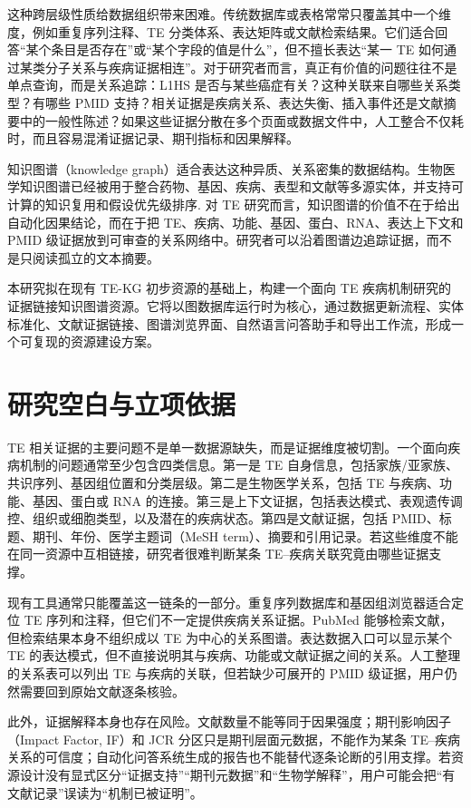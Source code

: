 \documentclass[12pt,a4paper,UTF8]{ctexart}
\begin{document}
这种跨层级性质给数据组织带来困难。传统数据库或表格常常只覆盖其中一个维度，例如重复序列注释、TE 分类体系、表达矩阵或文献检索结果。它们适合回答“某个条目是否存在”或“某个字段的值是什么”，但不擅长表达“某一 TE 如何通过某类分子关系与疾病证据相连”。对于研究者而言，真正有价值的问题往往不是单点查询，而是关系追踪：L1HS 是否与某些癌症有关？这种关联来自哪些关系类型？有哪些 PMID 支持？相关证据是疾病关系、表达失衡、插入事件还是文献摘要中的一般性陈述？如果这些证据分散在多个页面或数据文件中，人工整合不仅耗时，而且容易混淆证据记录、期刊指标和因果解释。

知识图谱（knowledge graph）适合表达这种异质、关系密集的数据结构。生物医学知识图谱已经被用于整合药物、基因、疾病、表型和文献等多源实体，并支持可计算的知识复用和假设优先级排序\cite{himmelstein2017hetionet,chandak2023building}. 对 TE 研究而言，知识图谱的价值不在于给出自动化因果结论，而在于把 TE、疾病、功能、基因、蛋白、RNA、表达上下文和 PMID 级证据放到可审查的关系网络中。研究者可以沿着图谱边追踪证据，而不是只阅读孤立的文本摘要。

本研究拟在现有 TE-KG 初步资源的基础上，构建一个面向 TE 疾病机制研究的证据链接知识图谱资源。它将以图数据库运行时为核心，通过数据更新流程、实体标准化、文献证据链接、图谱浏览界面、自然语言问答助手和导出工作流，形成一个可复现的资源建设方案。

\section{研究空白与立项依据}

TE 相关证据的主要问题不是单一数据源缺失，而是证据维度被切割。一个面向疾病机制的问题通常至少包含四类信息。第一是 TE 自身信息，包括家族/亚家族、共识序列、基因组位置和分类层级。第二是生物医学关系，包括 TE 与疾病、功能、基因、蛋白或 RNA 的连接。第三是上下文证据，包括表达模式、表观遗传调控、组织或细胞类型，以及潜在的疾病状态。第四是文献证据，包括 PMID、标题、期刊、年份、医学主题词（MeSH term）、摘要和引用记录。若这些维度不能在同一资源中互相链接，研究者很难判断某条 TE--疾病关联究竟由哪些证据支撑。

现有工具通常只能覆盖这一链条的一部分。重复序列数据库和基因组浏览器适合定位 TE 序列和注释，但它们不一定提供疾病关系证据。PubMed 能够检索文献，但检索结果本身不组织成以 TE 为中心的关系图谱。表达数据入口可以显示某个 TE 的表达模式，但不直接说明其与疾病、功能或文献证据之间的关系。人工整理的关系表可以列出 TE 与疾病的关联，但若缺少可展开的 PMID 级证据，用户仍然需要回到原始文献逐条核验。

此外，证据解释本身也存在风险。文献数量不能等同于因果强度；期刊影响因子（Impact Factor, IF）和 JCR 分区只是期刊层面元数据，不能作为某条 TE--疾病关系的可信度；自动化问答系统生成的报告也不能替代逐条论断的引用支撑。若资源设计没有显式区分“证据支持”“期刊元数据”和“生物学解释”，用户可能会把“有文献记录”误读为“机制已被证明”。
\end{document}
